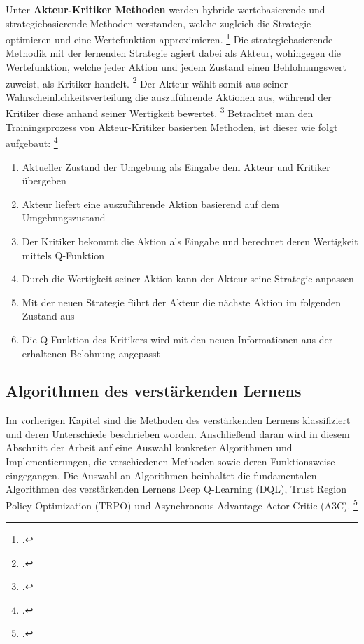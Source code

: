 Unter \textbf{Akteur-Kritiker Methoden} werden hybride wertebasierende und strategiebasierende Methoden verstanden, welche zugleich die Strategie optimieren und eine Wertefunktion approximieren. \footcite[Vgl.][S. 2f.]{Zhang.2018}
Die strategiebasierende Methodik mit der lernenden Strategie agiert dabei als Akteur, wohingegen die Wertefunktion, welche jeder Aktion und jedem Zustand einen Behlohnungswert zuweist, als Kritiker handelt. \footcite[Vgl.][S. 321]{Sutton.2018}
Der Akteur wählt somit aus seiner Wahrscheinlichkeitsverteilung die auszuführende Aktionen aus, während der Kritiker diese anhand seiner Wertigkeit bewertet. \footcite[Vgl.][S. 3]{Ningombam.2022}
Betrachtet man den Trainingsprozess von Akteur-Kritiker basierten Methoden, ist dieser wie folgt aufgebaut: \footcite[Vgl.][S. 4]{Ningombam.2022}
\begin{enumerate}
    \item Aktueller Zustand der Umgebung als Eingabe dem Akteur und Kritiker übergeben
    \item Akteur liefert eine auszuführende Aktion basierend auf dem Umgebungszustand
    \item Der Kritiker bekommt die Aktion als Eingabe und berechnet deren Wertigkeit mittels Q-Funktion
    \item Durch die Wertigkeit seiner Aktion kann der Akteur seine Strategie anpassen
    \item Mit der neuen Strategie führt der Akteur die nächste Aktion im folgenden Zustand aus
    \item Die Q-Funktion des Kritikers wird mit den neuen Informationen aus der erhaltenen Belohnung angepasst
\end{enumerate}

\subsection{Algorithmen des verstärkenden Lernens}
Im vorherigen Kapitel sind die Methoden des verstärkenden Lernens klassifiziert und deren Unterschiede beschrieben worden.
Anschließend daran wird in diesem Abschnitt der Arbeit auf eine Auswahl konkreter Algorithmen und Implementierungen, die verschiedenen Methoden sowie deren Funktionsweise eingegangen.
Die Auswahl an Algorithmen beinhaltet die fundamentalen Algorithmen des verstärkenden Lernens Deep Q-Learning (DQL), Trust Region Policy Optimization (TRPO) und Asynchronous Advantage Actor-Critic (A3C). \footcite[Vgl.][S. 1]{Arulkumaran.2017}

